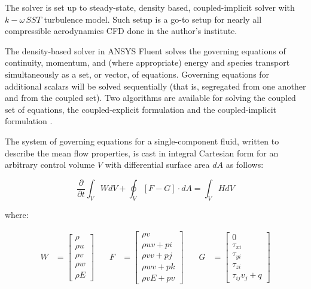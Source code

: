 The solver is set up to steady-state, density based, coupled-implicit solver with $k-\omega \, SST$ turbulence model. Such setup is a go-to setup for nearly all compressible aerodynamics CFD done in the author's institute.

The density-based solver in ANSYS Fluent solves the governing equations of continuity, momentum, and (where appropriate) energy and species transport simultaneously as a set, or vector, of equations. Governing equations for additional scalars will be solved sequentially (that is, segregated from one another and from the coupled set). Two algorithms are available for solving the coupled set of equations, the coupled-explicit formulation and the coupled-implicit formulation \citep{fluenttheory}.

The system of governing equations for a single-component fluid, written to describe the mean flow properties, is cast in integral Cartesian form for an arbitrary control volume $V$ with differential surface area $dA$ as follows:

\begin{equation} \label{eq:densitybased}
\frac{\partial}{\partial t} \int_V WdV + \oint_V \left[ F-G \right] \cdot dA = \int_V HdV
\end{equation}

\noindent where:

\begin{equation} \label{eq:desityvectors}
\begin{aligned}
	W &= \begin{bmatrix}
		\rho \\
		\rho u \\
		\rho v \\
		\rho w \\
		\rho E
	\end{bmatrix}
\end{aligned} \quad
\begin{aligned}
	F &= \begin{bmatrix}
		\rho v\\
		\rho uv + pi\\
		\rho vv + pj\\
		\rho wv + pk\\
		\rho vE + pv
	\end{bmatrix}
\end{aligned} \quad
\begin{aligned}
	G &= \begin{bmatrix}
		0 \\
		\tau_{xi} \\
		\tau_{yi} \\
		\tau_{zi} \\
		\tau_{ij} v_j + q
	\end{bmatrix}
\end{aligned}
\end{equation}

